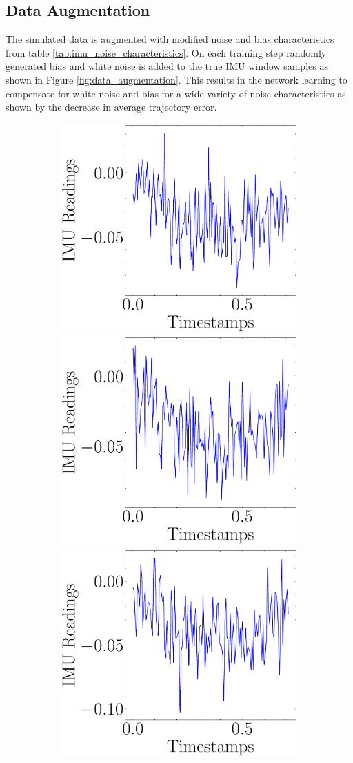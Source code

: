 \subsection{Data Augmentation}
The simulated data is augmented with modified noise and bias characteristics from table \ref{tab:imu_noise_characteristics}. On each training step randomly generated bias and white noise is added to the true IMU window samples as shown in Figure \ref{fig:data_augmentation}. This results in the network learning to compensate for white noise and bias for a wide variety of noise characteristics as shown by the decrease in average trajectory error. 


\begin{figure}[H]
    \begin{subfigure}{\linewidth}
    \includegraphics[width=.3\linewidth]{images/fig_chapter4/imu_windows/same_window_diff_noise_0.pdf}\hfill
    \includegraphics[width=.3\linewidth]{images/fig_chapter4/imu_windows/same_window_diff_noise_1.pdf}\hfill
    \includegraphics[width=.3\linewidth]{images/fig_chapter4/imu_windows/same_window_diff_noise_2.pdf}\hfill
    \end{subfigure}\par\medskip
    

\end{figure}
